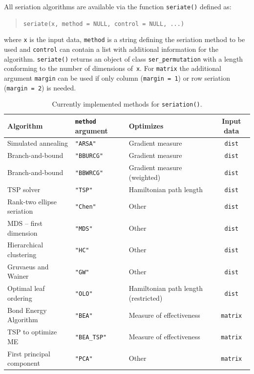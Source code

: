 \documentclass[fleqn, a4paper]{article}
\newcommand{\func}[1]{\mbox{\texttt{#1()}}}
\newcommand{\code}[1]{\mbox{\texttt{#1}}}
\begin{document}
All seriation algorithms are available via the function \func{seriate}
defined as:
\begin{quotation}
\code{seriate(x,  method = NULL, control = NULL, ...)}
\end{quotation}
where \code{x} is the input data, \code{method} is a string defining the
seriation method to be used and \code{control} can contain a list with
additional information for the algorithm.  \func{seriate} returns an object
of class \code{ser\_permutation} with a length conforming to the number of
dimensions of~\code{x}.  For \code{matrix} the additional argument
\code{margin} can be used if only column (\code{margin = 1}) or row seriation
(\code{margin = 2}) is needed.

\begin{table}[t]
\centering
    \begin{tabular}{lllc}
        \hline
Algorithm & \code{method} argument & Optimizes & Input data \\
        \hline
Simulated annealing & \code{"ARSA"} & Gradient measure &\code{dist} \\
Branch-and-bound & \code{"BBURCG"} & Gradient measure &\code{dist} \\
Branch-and-bound & \code{"BBWRCG"} & Gradient measure (weighted)& \code{dist} \\
TSP solver & \code{"TSP"} & Hamiltonian path length& \code{dist} \\
Rank-two ellipse seriation  & \code{"Chen"} & Other& \code{dist} \\
MDS -- first dimension & \code{"MDS"} & Other& \code{dist} \\
Hierarchical clustering & \code{"HC"} & Other& \code{dist} \\
Gruvaeus and Wainer & \code{"GW"} & Other& \code{dist} \\
Optimal leaf ordering  & \code{"OLO"} & 
    Hamiltonian path length (restricted)& \code{dist} \\
Bond Energy Algorithm & \code{"BEA"} &
    Measure of effectiveness & \code{matrix} \\
TSP to optimize ME & \code{"BEA\_TSP"} &
    Measure of effectiveness& \code{matrix} \\
First principal component & \code{"PCA"} & 
    Other& \code{matrix} \\
        \hline
    \end{tabular}
    \caption{Currently implemented methods for \func{seriation}.}
\label{tab:methods}
\end{table}
\end{document}
